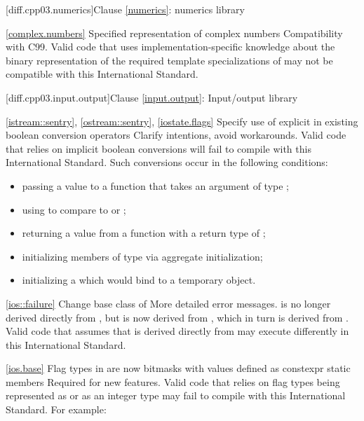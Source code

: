 [diff.cpp03.numerics]{Clause \ref{numerics}: numerics library}

\ref{complex.numbers}
\change Specified representation of complex numbers
\rationale Compatibility with C99.
\effect
Valid \CppIII code that uses implementation-specific knowledge about the
binary representation of the required template specializations of
 may not be compatible with this International Standard.

[diff.cpp03.input.output]{Clause \ref{input.output}: Input/output library}

\ref{istream::sentry},
\ref{ostream::sentry},
\ref{iostate.flags}
\change Specify use of explicit in existing boolean conversion operators
\rationale Clarify intentions, avoid workarounds.
\effect
Valid \CppIII code that relies on implicit boolean conversions will fail to
compile with this International Standard. Such conversions occur in the
following conditions:

\begin{itemize}
\item passing a value to a function that takes an argument of type ;
\item using  to compare to  or ;
\item returning a value from a function with a return type of ;
\item initializing members of type  via aggregate initialization;
\item initializing a  which would bind to a temporary object.
\end{itemize}

\ref{ios::failure}
\change Change base class of 
\rationale More detailed error messages.
\effect
{} is no longer derived directly from
, but is now derived from ,
which in turn is derived from . Valid \CppIII code
that assumes that  is derived directly from
 may execute differently in this International Standard.

\ref{ios.base}
\change Flag types in  are now bitmasks with values
defined as constexpr static members
\rationale Required for new features.
\effect
Valid \CppIII code that relies on  flag types being
represented as  or as an integer type may fail to compile
with this International Standard. For example:

